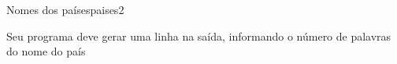 \documentclass[12pt,a4paper,oneside]{article}
\begin{document}
\begin{problem}{Nomes dos países}{paises}{2}
\OutputFile

Seu programa deve gerar uma linha na saída, informando o número de palavras do nome do país


\Example

\begin{example}
%
\end{example}

\begin{example}
%
\end{example}

\begin{example}
%
\end{example}

\begin{example}
%
\end{example}


\end{problem}
\end{document}
